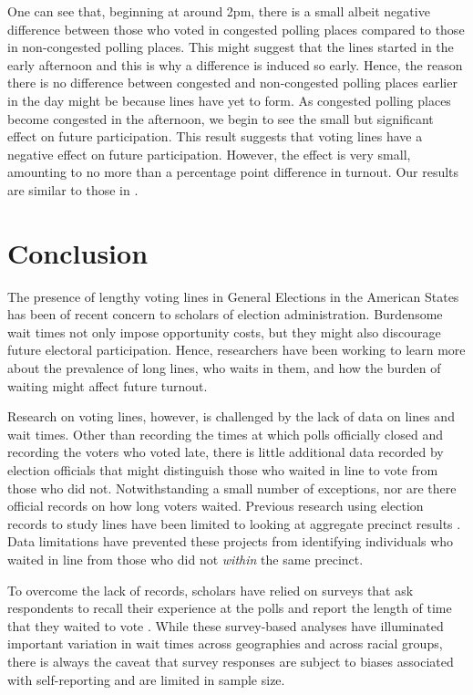 \documentclass[12pt,titlepage]{article}
\begin{document}
One can see that, beginning at around 2pm, there is a small albeit
negative difference between those who voted in congested polling
places compared to those in non-congested polling places.  This might
suggest that the lines started in the early afternoon and this is why
a difference is induced so early.  Hence, the reason there is no
difference between congested and non-congested polling places earlier
in the day might be because lines have yet to form. As congested
polling places become congested in the afternoon, we begin to see the
small but significant effect on future participation.  This result
suggests that voting lines have a negative effect on future
participation.  However, the effect is very small, amounting to no
more than a percentage point difference in turnout.  Our results are
similar to those in \citet{pettigrew:longlinesminorityprecincts}.

\section*{Conclusion}

The presence of lengthy voting lines in General Elections in the
American States has been of recent concern to scholars of election
administration. Burdensome wait times not only impose opportunity
costs, but they might also discourage future electoral participation.
Hence, researchers have been working to learn more about the
prevalence of long lines, who waits in them, and how the burden of
waiting might affect future turnout.

Research on voting lines, however, is challenged by the lack of data
on lines and wait times.  Other than recording the times at which
polls officially closed and recording the voters who voted late, there
is little additional data recorded by election officials that might
distinguish those who waited in line to vote from those who did not.
Notwithstanding a small number of exceptions, nor are there official
records on how long voters waited.  Previous research using election
records to study lines have been limited to looking at aggregate
precinct results \citep{herronsmith:closingtimes,
  pettigrew:longlinesminorityprecincts}.  Data limitations have
prevented these projects from identifying individuals who waited in
line from those who did not \emph{within} the same precinct.

To overcome the lack of records, scholars have relied on surveys that
ask respondents to recall their experience at the polls and report the
length of time that they waited to vote
\citep{stewart:waitingtovote2012, pettigrew:racegapwaittimes}.  While
these survey-based analyses have illuminated important variation in
wait times across geographies and across racial groups, there is
always the caveat that survey responses are subject to biases
associated with self-reporting and are limited in sample size.
\end{document}

